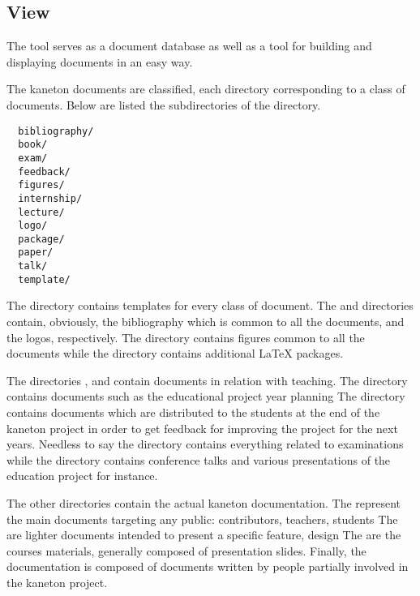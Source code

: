 %
%
%
%
%
%

%
%

\subsection{View}
\label{section:view}

The  tool serves as a document database as well as a tool for
building and displaying documents in an easy way.

The kaneton documents are classified, each directory corresponding to a
class of documents. Below are listed the subdirectories of the 
directory.

\begin{verbatim}
  bibliography/
  book/
  exam/
  feedback/
  figures/
  internship/
  lecture/
  logo/
  package/
  paper/
  talk/
  template/
\end{verbatim}

The  directory contains templates for every class of
document. The  and  directories
contain, obviously, the bibliography which is common to all the documents, and
the logos, respectively. The  directory contains figures
common to all the documents while the  directory contains
additional {\LaTeX} packages.

The directories ,  and
 contain documents in relation with teaching. The
 directory contains documents such as the educational
project year planning \etc{} The  directory contains
documents which are distributed to the students at the end of the kaneton
project in order to get feedback for improving the project for the next years.
Needless to say the  directory contains everything related to
examinations while the  directory contains conference talks
and various presentations of the education project for instance.

The other directories contain the actual kaneton documentation. The
 represent the main documents targeting any public:
contributors, teachers, students \etc{} The  are lighter
documents intended to present a specific feature, design \etc{} The
 are the courses materials, generally composed of
presentation slides. Finally, the  documentation is
composed of documents written by people partially involved in the kaneton
project.

